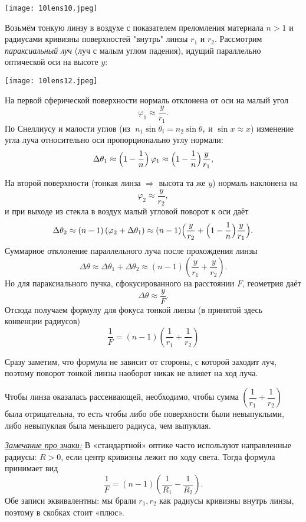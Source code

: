 \documentclass[12pt, a4paper]{article}%
\begin{document}
\begin{center}
\texttt{[image: 10lens10.jpeg]}
\label{fig:mpr}
\end{center}

Возьмём тонкую линзу в воздухе с показателем преломления материала $n>1$ и 
радиусами кривизны поверхностей "внутрь" линзы $r_1$ и $r_2$. Рассмотрим \textit{параксиальный луч} (луч с малым углом падения), идущий параллельно оптической оси на высоте $y$:

\begin{center}
\texttt{[image: 10lens12.jpeg]}
\label{fig:mpr}
\end{center}

На первой сферической поверхности нормаль отклонена от оси на малый угол
\[
\varphi_1 \approx \frac{y}{r_1}.
\]
По Снеллиусу и малости углов (из $\;n_1\sin \theta_i=n_2\sin \theta_r$ и $\sin x\approx x$) изменение угла луча относительно оси пропорционально углу нормали:
\[
\Delta\theta_1 \approx \Bigl(1-\frac1n\Bigr)\,\varphi_1 \approx \Bigl(1-\frac1n\Bigr)\frac{y}{r_1},
\]

На второй поверхности (тонкая линза $\Rightarrow$ высота та же $y$) нормаль наклонена на
\[
\varphi_2 \approx \frac{y}{r_2},
\]
и при выходе из стекла в воздух малый угловой поворот к оси даёт
\[
\Delta\theta_2 \approx (n-1)\,(\varphi_2 + \Delta\theta_1) \approx (n-1)\Bigl(\frac{y}{r_2}+\Bigl(1-\frac1n\Bigr)\frac{y}{r_1}\Bigr).
\]
Суммарное отклонение параллельного луча после прохождения линзы
\[
\Delta\theta \approx \Delta\theta_1+\Delta\theta_2 \approx (n-1)\left(\frac{y}{r_1}+\frac{y}{r_2}\right).
\]
Но для параксиального пучка, сфокусированного на расстоянии $F$, геометрия даёт
\[
\Delta\theta \approx \frac{y}{F}.
\]
Отсюда получаем формулу для фокуса тонкой линзы (в принятой здесь конвенции радиусов)
\[
\boxed{\ \frac{1}{F}=(n-1)\left(\frac{1}{r_1}+\frac{1}{r_2}\right)\ }
\]

Сразу заметим, что формула не зависит от стороны, с которой заходит луч, поэтому поворот тонкой линзы наоборот никак не влияет на ход луча.

Чтобы линза оказалась рассеивающей, необходимо, чтобы сумма $\left(\dfrac{1}{r_1}+\dfrac{1}{r_2}\right)$ была отрицательна, то есть чтобы либо обе поверхности были невыпуклыми, либо невыпуклая была меньшего радиуса, чем выпуклая.

\textit{\underline{Замечание про знаки:}} В «стандартной» оптике часто используют направленные радиусы: $R>0$, если центр кривизны лежит по ходу света. Тогда формула принимает вид
\[
\frac{1}{F}=(n-1)\left(\frac{1}{R_1}-\frac{1}{R_2}\right).
\]
Обе записи эквивалентны:  мы брали $r_1,r_2$ как радиусы кривизны внутрь линзы, поэтому в скобках стоит «плюс».
\end{document}
